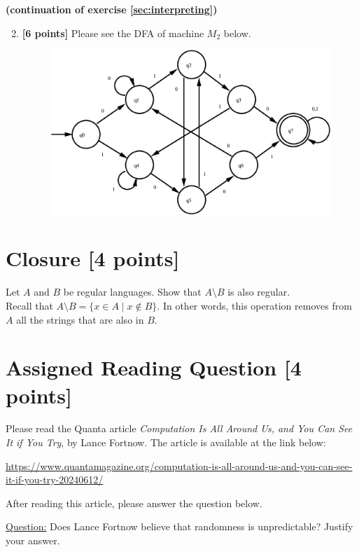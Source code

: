 \newpage
{\begin{center}\textbf{(continuation of exercise \ref{sec:interpreting})}\end{center}}
\begin{enumerate}[label=(\roman*)]\setcounter{enumi}{1}
\item \textbf{[6 points]}
Please see the DFA of machine $M_2$ below.
\begin{figure}[h]
\begin{center}
{
\includegraphics[width=0.5\columnwidth]{figs/dfa3}
}
\end{center}
\end{figure}

\end{enumerate}







\newpage
\section{Closure [4 points]}
Let $A$ and $B$ be regular languages.  Show that $A\setminus B$ is also regular.\\ 
Recall that $A\setminus B = \{x\in A \mid x \not\in B\}$. 
In other words, this operation removes from $A$ all the strings that are also in $B$.








\newpage
\section{Assigned Reading Question [4 points]}
Please read the Quanta article \emph{Computation Is All Around Us, and You Can See It if You Try}, by Lance Fortnow.  The article is available at the link below:
\begin{center}
{\small\href{https://www.quantamagazine.org/computation-is-all-around-us-and-you-can-see-it-if-you-try-20240612/}{https://www.quantamagazine.org/computation-is-all-around-us-and-you-can-see-it-if-you-try-20240612/}}
\end{center}
After reading this article, please answer the question below.

\medskip

\noindent\underline{Question:}
Does Lance Fortnow believe that randomness is unpredictable?  Justify your answer.





